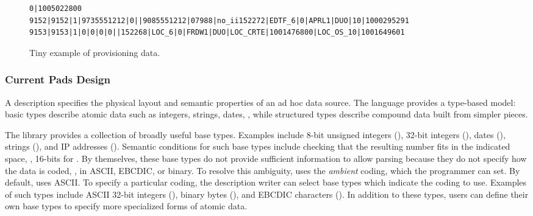 \documentclass[11pt]{article}
\begin{document}
\begin{figure*}
\begin{small}
\begin{verbatim}
0|1005022800
9152|9152|1|9735551212|0||9085551212|07988|no_ii152272|EDTF_6|0|APRL1|DUO|10|1000295291
9153|9153|1|0|0|0|0||152268|LOC_6|0|FRDW1|DUO|LOC_CRTE|1001476800|LOC_OS_10|1001649601
\end{verbatim}
\caption{Tiny example of \dibbler{} provisioning data.}
\label{figure:dibbler-records}
\end{small}
\end{figure*}


\subsubsection{Current Pads Design}

A \pads{} description specifies the physical layout and 
semantic properties of an ad hoc data source. 
The language provides a type-based model:
basic types describe atomic data such as integers, strings, dates, \etc{}, while
structured types describe compound data built from simpler pieces.
\suppressfloats

The \pads{} library provides a collection of broadly useful base types.
Examples include
8-bit unsigned integers (),
32-bit integers (),
dates (), strings (), and IP addresses ().
Semantic conditions for such base types include checking that the
resulting number fits in the indicated space, \ie, 16-bits for
.
By themselves, these base types do not provide sufficient information to allow parsing
because they do not specify how the data is coded, \ie{}, in ASCII, EBCDIC, or binary.  
To resolve this ambiguity, \pads{} uses the \textit{ambient} coding, which the programmer can set.  By default,
\pads{} uses ASCII.  To specify a particular coding, the description writer can select
base types which indicate the coding to use.  Examples of such types include
ASCII 32-bit integers (), binary bytes (), and
EBCDIC characters ().  
In addition to these types,  users can define their own base types to specify more
specialized forms of atomic data.  
\end{document}
